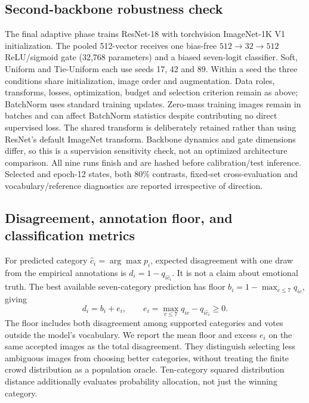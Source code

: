 \documentclass[pdflatex,sn-mathphys-num]{sn-jnl}
\begin{document}
\subsection{Second-backbone robustness check}
The final adaptive phase trains ResNet-18 \cite{he2016resnet} with torchvision ImageNet-1K V1 initialization. The pooled 512-vector receives one bias-free $512\!\to\!32\!\to\!512$ ReLU/sigmoid gate (32,768 parameters) and a biased seven-logit classifier. Soft, Uniform and Tie-Uniform each use seeds 17, 42 and 89. Within a seed the three conditions share initialization, image order and augmentation. Data roles, transforms, losses, optimization, budget and selection criterion remain as above; BatchNorm uses standard training updates. Zero-mass training images remain in batches and can affect BatchNorm statistics despite contributing no direct supervised loss. The shared transform is deliberately retained rather than using ResNet's default ImageNet transform. Backbone dynamics and gate dimensions differ, so this is a supervision sensitivity check, not an optimized architecture comparison. All nine runs finish and are hashed before calibration/test inference. Selected and epoch-12 states, both 80\% contrasts, fixed-set cross-evaluation and vocabulary/reference diagnostics are reported irrespective of direction.

\subsection{Disagreement, annotation floor, and classification metrics}
For predicted category $\hat c_i=\arg\max p_i$, expected disagreement with one draw from the empirical annotations is $d_i=1-q_{i\hat c_i}$. It is not a claim about emotional truth. The best available seven-category prediction has floor $b_i=1-\max_{c\leq7}q_{ic}$, giving
\begin{equation}
d_i=b_i+e_i,\qquad e_i=\max_{c\leq7}q_{ic}-q_{i\hat c_i}\geq0.
\label{eq:decomposition}
\end{equation}
The floor includes both disagreement among supported categories and votes outside the model's vocabulary. We report the mean floor and excess $e_i$ on the same accepted images as the total disagreement. They distinguish selecting less ambiguous images from choosing better categories, without treating the finite crowd distribution as a population oracle. Ten-category squared distribution distance additionally evaluates probability allocation, not just the winning category.
\end{document}
